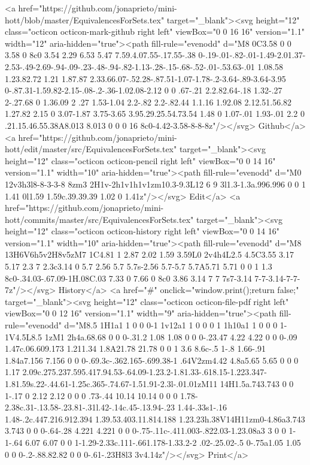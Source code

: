       <a href="https://github.com/jonaprieto/mini-hott/blob/master/EquivalencesForSets.tex" target="_blank"><svg height="12" class="octicon octicon-mark-github right left" viewBox="0 0 16 16" version="1.1" width="12" aria-hidden="true"><path fill-rule="evenodd" d="M8 0C3.58 0 0 3.58 0 8c0 3.54 2.29 6.53 5.47 7.59.4.07.55-.17.55-.38 0-.19-.01-.82-.01-1.49-2.01.37-2.53-.49-2.69-.94-.09-.23-.48-.94-.82-1.13-.28-.15-.68-.52-.01-.53.63-.01 1.08.58 1.23.82.72 1.21 1.87.87 2.33.66.07-.52.28-.87.51-1.07-1.78-.2-3.64-.89-3.64-3.95 0-.87.31-1.59.82-2.15-.08-.2-.36-1.02.08-2.12 0 0 .67-.21 2.2.82.64-.18 1.32-.27 2-.27.68 0 1.36.09 2 .27 1.53-1.04 2.2-.82 2.2-.82.44 1.1.16 1.92.08 2.12.51.56.82 1.27.82 2.15 0 3.07-1.87 3.75-3.65 3.95.29.25.54.73.54 1.48 0 1.07-.01 1.93-.01 2.2 0 .21.15.46.55.38A8.013 8.013 0 0 0 16 8c0-4.42-3.58-8-8-8z"/></svg> Github</a>
      <a href="https://github.com/jonaprieto/mini-hott/edit/master/src/EquivalencesForSets.tex" target="_blank"><svg height="12" class="octicon octicon-pencil right left" viewBox="0 0 14 16" version="1.1" width="10" aria-hidden="true"><path fill-rule="evenodd" d="M0 12v3h3l8-8-3-3-8 8zm3 2H1v-2h1v1h1v1zm10.3-9.3L12 6 9 3l1.3-1.3a.996.996 0 0 1 1.41 0l1.59 1.59c.39.39.39 1.02 0 1.41z"/></svg> Edit</a>
      <a href="https://github.com/jonaprieto/mini-hott/commits/master/src/EquivalencesForSets.tex" target="_blank"><svg height="12" class="octicon octicon-history right left" viewBox="0 0 14 16" version="1.1" width="10" aria-hidden="true"><path fill-rule="evenodd" d="M8 13H6V6h5v2H8v5zM7 1C4.81 1 2.87 2.02 1.59 3.59L0 2v4h4L2.5 4.5C3.55 3.17 5.17 2.3 7 2.3c3.14 0 5.7 2.56 5.7 5.7s-2.56 5.7-5.7 5.7A5.71 5.71 0 0 1 1.3 8c0-.34.03-.67.09-1H.08C.03 7.33 0 7.66 0 8c0 3.86 3.14 7 7 7s7-3.14 7-7-3.14-7-7-7z"/></svg> History</a>
      <a  href="#" onclick="window.print();return false;" target="_blank"><svg height="12" class="octicon octicon-file-pdf right left" viewBox="0 0 12 16" version="1.1" width="9" aria-hidden="true"><path fill-rule="evenodd" d="M8.5 1H1a1 1 0 0 0-1 1v12a1 1 0 0 0 1 1h10a1 1 0 0 0 1-1V4.5L8.5 1zM1 2h4a.68.68 0 0 0-.31.2 1.08 1.08 0 0 0-.23.47 4.22 4.22 0 0 0-.09 1.47c.06.609.173 1.211.34 1.8A21.78 21.78 0 0 1 3.6 8.6c-.5 1-.8 1.66-.91 1.84a7.156 7.156 0 0 0-.69.3c-.362.165-.699.38-1 .64V2zm4.42 4.8a5.65 5.65 0 0 0 1.17 2.09c.275.237.595.417.94.53-.64.09-1.23.2-1.81.33-.618.15-1.223.347-1.81.59s.22-.44.61-1.25c.365-.74.67-1.51.91-2.3l-.01.01zM11 14H1.5a.743.743 0 0 1-.17 0 2.12 2.12 0 0 0 .73-.44 10.14 10.14 0 0 0 1.78-2.38c.31-.13.58-.23.81-.31l.42-.14c.45-.13.94-.23 1.44-.33s1-.16 1.48-.2c.447.216.912.394 1.39.53.403.11.814.188 1.23.23h.38V14H11zm0-4.86a3.743 3.743 0 0 0-.64-.28 4.221 4.221 0 0 0-.75-.11c-.411.003-.822.03-1.23.08a3 3 0 0 1-1-.64 6.07 6.07 0 0 1-1.29-2.33c.111-.661.178-1.33.2-2 .02-.25.02-.5 0-.75a1.05 1.05 0 0 0-.2-.88.82.82 0 0 0-.61-.23H8l3 3v4.14z"/></svg> Print</a>
